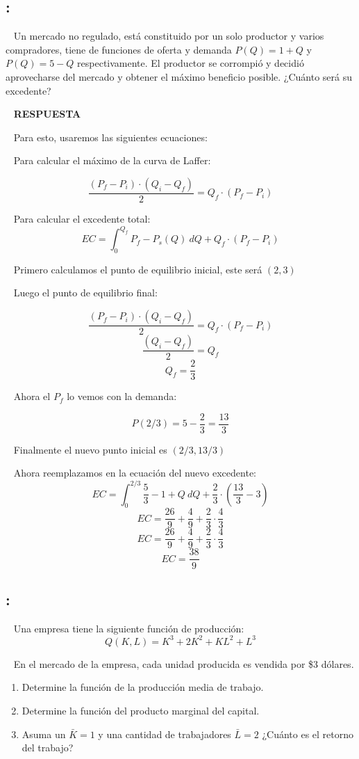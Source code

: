 \documentclass[
  letterpaper,
  DIV=11,
  numbers=noendperiod]{scrreport}
\begin{document}
\hypertarget{section-37}{%
\subsection{:}\label{section-37}}

~ Un mercado no regulado, está constituido por un solo productor y
varios compradores, tiene de funciones de oferta y demanda \(P(Q)=1+Q\)
y \(P(Q)=5-Q\) respectivamente. El productor se corrompió y decidió
aprovecharse del mercado y obtener el máximo beneficio posible. ¿Cuánto
será su excedente?

~ \textbf{RESPUESTA}

~ Para esto, usaremos las siguientes ecuaciones:

~ Para calcular el máximo de la curva de Laffer:

\[
\frac{(P_f-P_i)\cdot (Q_i-Q_f)}{2}=Q_f\cdot (P_f-P_i)
\]

~ Para calcular el excedente total: \[
EC = \int_{0}^{Q_f}{P_f-P_s(Q) \ dQ} + Q_f\cdot (P_f-P_i) 
\]

~ Primero calculamos el punto de equilibrio inicial, este será \((2,3)\)

~ Luego el punto de equilibrio final:

\[
\frac{(P_f-P_i)\cdot (Q_i-Q_f)}{2}=Q_f\cdot (P_f-P_i)
\] \[
\frac{(Q_i-Q_f)}{2}=Q_f
\] \[
Q_f=\frac{2}{3}
\]

~ Ahora el \(P_f\) lo vemos con la demanda:

\[
P(2/3)=5-\frac{2}{3}=\frac{13}{3}
\]

~ Finalmente el nuevo punto inicial es \((2/3,13/3)\)

~ Ahora reemplazamos en la ecuación del nuevo excedente: \[
EC = \int_{0}^{2/3}{\frac{5}{3}-1+Q \ dQ} + \frac{2}{3}\cdot (\frac{13}{3}-3)
\] \[
EC = \frac{26}{9}+\frac{4}{9}+ \frac{2}{3}\cdot \frac{4}{3}
\] \[
EC = \frac{26}{9}+\frac{4}{9}+ \frac{2}{3}\cdot \frac{4}{3}
\] \[
EC = \frac{38}{9}
\]

\hypertarget{section-38}{%
\subsection{:}\label{section-38}}

~ Una empresa tiene la siguiente función de producción: \[
Q(K,L)=K^3+2K^2+KL^2+L^3
\]

~ En el mercado de la empresa, cada unidad producida es vendida por \$3
dólares.

\begin{enumerate}
\def\labelenumi{\arabic{enumi})}
\item
  Determine la función de la producción media de trabajo.
\item
  Determine la función del producto marginal del capital.
\item
  Asuma un \(\bar{K}=1\) y una cantidad de trabajadores \(\bar{L}=2\)
  ¿Cuánto es el retorno del trabajo?
\end{enumerate}
\end{document}
